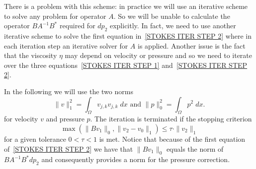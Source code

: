 There is a problem with this scheme: in practice we will use an iterative
scheme to solve any problem for operator $A$.
So we will be unable to calculate the operator $ B A^{-1} B^{*}$ required for
$dp_{2}$ explicitly. In fact, we need to use another iterative scheme to solve
the first equation in~\ref{STOKES ITER STEP 2} where in each iteration step
an iterative solver for $A$ is applied. Another issue is the fact that the
viscosity $\eta$ may depend on velocity or pressure and so we need to iterate
over the three equations~\ref{STOKES ITER STEP 1} and~\ref{STOKES ITER STEP 2}. 

In the following we will use the two norms
\begin{equation}
\|v\|_{1}^2 = \int_{\Omega} v_{j,k}v_{j,k} \; dx 
\mbox{ and }
\|p\|_{0}^2= \int_{\Omega} p^2 \; dx.
\label{STOKES STOP}
\end{equation}
for velocity $v$ and pressure $p$.
The iteration is terminated if the stopping criterion
 \begin{equation} \label{STOKES STOPPING CRITERIA}
\max(\|Bv_{1}\|_{0},\|v_{2}-v_{0}\|_{1}) \le \tau \cdot \|v_{2}\|_{1} 
 \end{equation}
for a given tolerance $0<\tau<1$ is met.
Notice that because of the first equation of~\ref{STOKES ITER STEP 2} we have
that $\|Bv_{1}\|_{0}$ equals the norm of $B A^{-1} B^{*} dp_{2}$ and
consequently provides a norm for the pressure correction.

